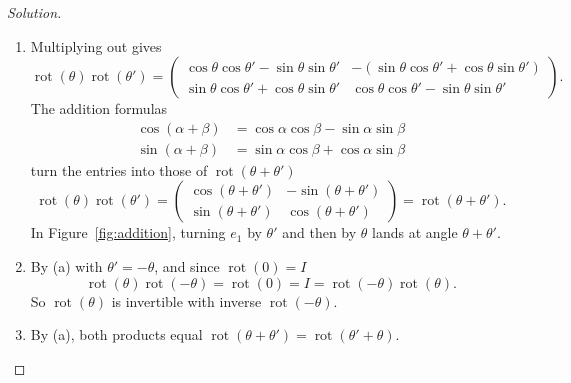 \documentclass[11pt,a4paper]{article}
\theoremstyle{boxed}
\theoremstyle{definition}
\newenvironment{solution}{\begin{proof}[Solution]}{\end{proof}}
\newenvironment{plate}{\par\medskip\noindent\begin{minipage}{\linewidth}\centering}{\end{minipage}\par\medskip}
\DeclareMathOperator{\rot}{rot}
\begin{document}
\begin{solution}
\leavevmode
\begin{enumerate}
    \item Multiplying out gives
    \[
    \rot(\theta)\rot(\theta')=\begin{pmatrix}\cos\theta\cos\theta'-\sin\theta\sin\theta' & -(\sin\theta\cos\theta'+\cos\theta\sin\theta')\\ \sin\theta\cos\theta'+\cos\theta\sin\theta' & \cos\theta\cos\theta'-\sin\theta\sin\theta'\end{pmatrix}.
    \]
    The addition formulas
    \begin{align*}
    \cos(\alpha+\beta) &= \cos\alpha\cos\beta-\sin\alpha\sin\beta\\
    \sin(\alpha+\beta) &= \sin\alpha\cos\beta+\cos\alpha\sin\beta
    \end{align*}
    turn the entries into those of $\rot(\theta+\theta')$
    \[
    \rot(\theta)\rot(\theta')=\begin{pmatrix}\cos(\theta+\theta') & -\sin(\theta+\theta')\\ \sin(\theta+\theta') & \cos(\theta+\theta')\end{pmatrix}=\rot(\theta+\theta').
    \]
    In Figure~\ref{fig:addition}, turning $e_1$ by $\theta'$ and then by $\theta$ lands at angle $\theta+\theta'$.
    \item By (a) with $\theta'=-\theta$, and since $\rot(0)=I$
    \[
    \rot(\theta)\rot(-\theta)=\rot(0)=I=\rot(-\theta)\rot(\theta).
    \]
    So $\rot(\theta)$ is invertible with inverse $\rot(-\theta)$.
    \item By (a), both products equal $\rot(\theta+\theta')=\rot(\theta'+\theta)$. \qedhere
\end{enumerate}
\end{solution}

\begin{plate}
\label{fig:addition}
\end{plate}
\end{document}

